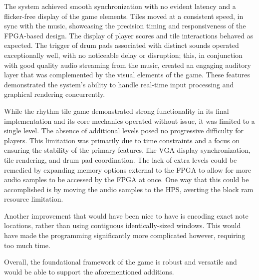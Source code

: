 \documentclass{subfile}
\begin{document}
The system achieved smooth synchronization with no evident latency and a flicker-free 
display of the game elements. 
Tiles moved at a consistent speed, in sync with the music, showcasing the precision timing and 
responsiveness of the FPGA-based design. 
The display of player scores and tile interactions behaved as expected. 
The trigger of drum pads associated with distinct sounds operated exceptionally well, with 
no noticeable delay or disruption; this, in conjunction with good quality 
audio streaming from the music, created an engaging auditory layer that was  
complemented by the visual elements of the game. 
These features demonstrated the system's ability to handle real-time input 
processing and graphical rendering concurrently. 

While the rhythm tile game demonstrated strong functionality in its final 
implementation and its core mechanics operated without issue, it was 
limited to a single level. 
The absence of additional levels posed no progressive difficulty for players. 
This limitation was primarily due to time constraints and a focus on 
ensuring the stability of the primary features, like VGA display synchronization, 
tile rendering, and drum pad coordination. The lack of extra levels 
could be remedied by expanding memory options external to the FPGA to allow for 
more audio samples to be accessed by the FPGA at once.
One way that this could be accomplished is by moving the audio samples to the HPS, 
averting the block ram resource limitation.

Another improvement that would have been nice to have is encoding exact note locations, rather 
than using contiguous identically-sized windows. 
This would have made the programming significantly more complicated however, requiring too 
much time.

Overall, the foundational framework of the game is robust and versatile and would be able to support the aforementioned additions. 
\end{document}
